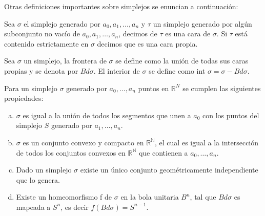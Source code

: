 %
Otras definiciones importantes sobre simplejos se enuncian a continuación:
\begin{Defi}
Sea $\sigma$ el simplejo generado por $a_0,a_1,\ldots,a_n$ y $\tau$ un simplejo generado por algún subconjunto no vacío de $a_0,a_1,\ldots,a_n$, decimos de $\tau$ es una cara de $\sigma$. Si $\tau$ está contenido estrictamente en $\sigma$ decimos que es una cara propia. 
\end{Defi}
\begin{Defi}
Sea $\sigma$ un simplejo, la frontera de $\sigma$ se define como la unión de todas sus caras propias y se denota por $Bd\sigma$. El interior de $\sigma$ se define como int $\sigma = \sigma-Bd\sigma$. 
\end{Defi}
\begin{Prop}
Para un simplejo $\sigma$ generado por $a_0,\ldots,a_n$ puntos en $\mathbb{R}^{N}$ se cumplen las siguientes propiedades:
\begin{enumerate}[(a)]
\item $\sigma$ es igual a la unión de todos los segmentos que unen a $a_0$ con los puntos del simplejo $S$ generado por $a_1,\ldots,a_n$.
\item $\sigma$ es un conjunto convexo y compacto en $\mathbb{R^{N}}$, el cual es igual a la intersección de todos los conjuntos convexos en $\mathbb{R^{N}}$ que contienen a $a_0,\ldots,a_n$.
\item Dado un simplejo $\sigma$ existe un único conjunto geométricamente independiente que lo genera.
\item Existe un homeomorfismo f de $\sigma$ en la bola unitaria $B^n$, tal que $Bd\sigma$ es mapeada a $S^n$, es decir $f(Bd\sigma) = S^{n-1}$.
\end{enumerate}
\end{Prop}

